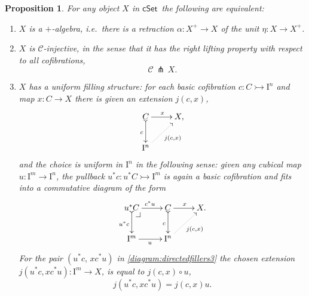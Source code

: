 \documentclass[12pt]{article}
\makeatletter
\newcommand{\cSet}{\ensuremath{\mathsf{cSet}}}
\newcommand{\pbcorner}[1][dr]{\save*!/#1-1.2pc/#1:(-1,1)@^{|-}\restore}
\newcommand{\mono}{\ensuremath{\rightarrowtail}}
\newcommand{\ra}{\ensuremath{\rightarrow}}
\newcommand{\I}{\ensuremath{\mathrm{I}}}
\newtheorem{proposition}[theorem]{Proposition}
\theoremstyle{remark}
\theoremstyle{definition}
\makeatother
\begin{document}
\begin{proposition}\label{prop:uniformstructequiv} For any object $X$ in \cSet\ the following are equivalent:
\begin{enumerate}
\item $X$ is a \emph{$+$-algebra}, i.e.\ there is a retraction $\alpha :X^+ \ra X$ of the unit $\eta : X\ra X^+$.
\item $X$ is  \emph{$\mathcal{C}$-injective}, in the sense that it has the right lifting property with respect to all cofibrations,
\[
\mathcal{C}\, \pitchfork\,X.
\]
\item $X$ has a \emph{uniform filling structure}: 
for each basic cofibration $c : C \mono \I^{n}$ and map $x : C\ra X$ there is given an extension $j(c,x)$,
\begin{equation}\label{diagram:directedfillers}
\xymatrix{
C \ar@{>->}[d]_{c} \ar[r]^{x} & X, \\
\I^{n}\ar@{.>}[ru]_{j(c,x)} &
}
\end{equation}
and the choice is \emph{uniform in $\I^n$} in the following sense: given any cubical map $u : \I^m \ra \I^n$, the pullback $u^*c : u^*C\mono \I^m$ is again a basic cofibration and fits into a commutative diagram of the form
\begin{equation}\label{diagram:directedfillers3}
\xymatrix{
u^*C \ar@{>->}[d]_{u^*c} \ar[r]^{c^*u} \pbcorner &  C \ar@{>->}[d]_{c} \ar[r]^{x} & X. \\
\I^{m} \ar[r]_{u} & \I^{n} \ar@{.>}[ru]_{j(c,x)} &
}
\end{equation}
For the pair $(u^*c,\, xc^*u)$ in \eqref{diagram:directedfillers3} the chosen extension $j(u^*c,xc^*u): \I^m \ra X$, is equal to  $j(c,x)\circ u$,
\begin{equation}\label{eq:uniformfillers}
j(u^*c,xc^*u) = j(c,x) u.
\end{equation}
\end{enumerate}
\end{proposition}
\end{document}
